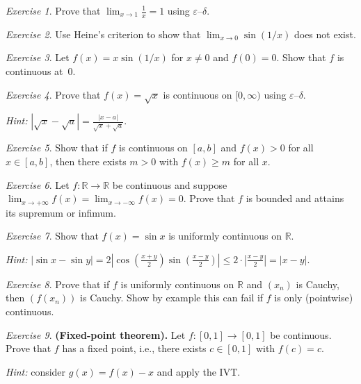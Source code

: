 \documentclass[12pt,a4paper,openany]{book}
\theoremstyle{definition}
\theoremstyle{remark}
\newtheorem{exercise}{Exercise}[chapter]
\begin{document}
\begin{exercise}\label{exo:ch5-2}
Prove that $\displaystyle\lim_{x\to 1}\frac{1}{x}=1$ using
$\varepsilon$--$\delta$.
\end{exercise}

\begin{exercise}\label{exo:ch5-3}
Use Heine's criterion to show that
$\displaystyle\lim_{x\to 0}\sin(1/x)$ does not exist.
\end{exercise}

\begin{exercise}\label{exo:ch5-4}
Let $f(x)=x\sin(1/x)$ for $x\neq 0$ and $f(0)=0$.  Show that $f$ is
continuous at~$0$.
\end{exercise}

\begin{exercise}\label{exo:ch5-5}
Prove that $f(x)=\sqrt{x}$ is continuous on $[0,\infty)$ using
$\varepsilon$--$\delta$.

\emph{Hint:} $|\sqrt{x}-\sqrt{a}|
=\frac{|x-a|}{\sqrt{x}+\sqrt{a}}$.
\end{exercise}

\begin{exercise}\label{exo:ch5-6}
Show that if $f$ is continuous on $[a,b]$ and $f(x)>0$ for all
$x\in[a,b]$, then there exists $m>0$ with $f(x)\ge m$ for all $x$.
\end{exercise}

\begin{exercise}\label{exo:ch5-7}
Let $f\colon\mathbb{R}\to\mathbb{R}$ be continuous and suppose
$\lim_{x\to+\infty}f(x)=\lim_{x\to-\infty}f(x)=0$.  Prove that $f$
is bounded and attains its supremum or infimum.
\end{exercise}

\begin{exercise}\label{exo:ch5-8}
Show that $f(x)=\sin x$ is uniformly continuous on $\mathbb{R}$.

\emph{Hint:} $|\sin x-\sin y|=2|\cos(\frac{x+y}{2})\sin(\frac{x-y}{2})|
\le 2\cdot|\frac{x-y}{2}|=|x-y|$.
\end{exercise}

\begin{exercise}\label{exo:ch5-9}
Prove that if $f$ is uniformly continuous on $\mathbb{R}$ and $(x_n)$
is Cauchy, then $(f(x_n))$ is Cauchy.  Show by example this can fail
if $f$ is only (pointwise) continuous.
\end{exercise}

\begin{exercise}\label{exo:ch5-10}
\textbf{(Fixed-point theorem).}\;
Let $f\colon[0,1]\to[0,1]$ be continuous.  Prove that $f$ has a fixed
point, i.e., there exists $c\in[0,1]$ with $f(c)=c$.

\emph{Hint:} consider $g(x)=f(x)-x$ and apply the IVT.
\end{exercise}
\end{document}
